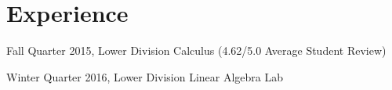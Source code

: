 \documentclass[letterpaper]{deedy-resume} %
\begin{document}
\begin{minipage}[t]{0.33\textwidth}


\end{minipage} %
\hfill
%
%
\begin{minipage}[t]{0.66\textwidth} %


\section{Experience}






\vspace{\topsep} %
\begin{tightitemize}
\item Fall Quarter 2015, Lower Division Calculus (4.62/5.0 Average Student Review)
\item Winter Quarter 2016, Lower Division Linear Algebra Lab
\end{tightitemize}


\end{minipage}
\end{document}

